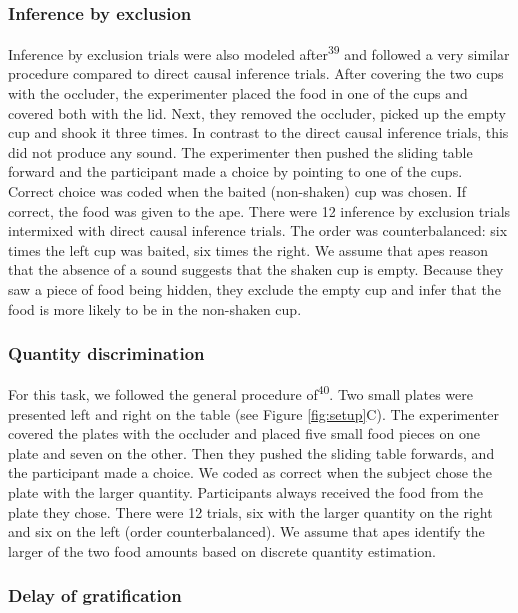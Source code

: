 \documentclass[
  man,floatsintext]{apa6}
\begin{document}
\hypertarget{inference-by-exclusion}{%
\subsubsection{Inference by exclusion}\label{inference-by-exclusion}}

Inference by exclusion trials were also modeled after\textsuperscript{39} and followed a very similar procedure compared to direct causal inference trials. After covering the two cups with the occluder, the experimenter placed the food in one of the cups and covered both with the lid. Next, they removed the occluder, picked up the empty cup and shook it three times. In contrast to the direct causal inference trials, this did not produce any sound. The experimenter then pushed the sliding table forward and the participant made a choice by pointing to one of the cups. Correct choice was coded when the baited (non-shaken) cup was chosen. If correct, the food was given to the ape. There were 12 inference by exclusion trials intermixed with direct causal inference trials. The order was counterbalanced: six times the left cup was baited, six times the right. We assume that apes reason that the absence of a sound suggests that the shaken cup is empty. Because they saw a piece of food being hidden, they exclude the empty cup and infer that the food is more likely to be in the non-shaken cup.

\hypertarget{quantity-discrimination}{%
\subsubsection{Quantity discrimination}\label{quantity-discrimination}}

For this task, we followed the general procedure of\textsuperscript{40}. Two small plates were presented left and right on the table (see Figure \ref{fig:setup}C). The experimenter covered the plates with the occluder and placed five small food pieces on one plate and seven on the other. Then they pushed the sliding table forwards, and the participant made a choice. We coded as correct when the subject chose the plate with the larger quantity. Participants always received the food from the plate they chose. There were 12 trials, six with the larger quantity on the right and six on the left (order counterbalanced). We assume that apes identify the larger of the two food amounts based on discrete quantity estimation.

\hypertarget{delay-of-gratification}{%
\subsubsection{Delay of gratification}\label{delay-of-gratification}}
\end{document}
